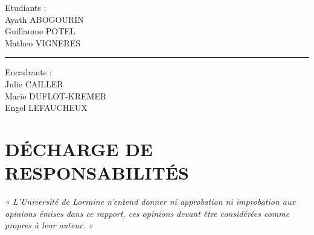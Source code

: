 \documentclass[11pt]{article}
\begin{document}
\begin{titlepage}
    \begin{minipage}[t]{0.45\textwidth}
        \begin{flushleft}
            \small Etudiants : \\
            \hspace*{1.5em} Ayath ABOGOURIN \\
            \hspace*{1.5em} Guillaume POTEL \\
            \hspace*{1.5em} Matheo VIGNERES
        \end{flushleft}
    \end{minipage}%
    \begin{minipage}[t]{0.1\textwidth}
        \vspace*{0.5em} %
        \centering
        \rule{1pt}{\baselineskip + 0.5em} %
    \end{minipage}%
    \begin{minipage}[t]{0.45\textwidth}
        \begin{flushright}
            \small Encadrants : \\
            \hspace*{0pt}\llap{\hspace*{1.5em}} Julie CAILLER \\
            \hspace*{0pt}\llap{\hspace*{1.5em}} Marie DUFLOT-KREMER \\
            \hspace*{0pt}\llap{\hspace*{1.5em}} Engel LEFAUCHEUX
        \end{flushright}
    \end{minipage}

\end{titlepage}


\newpage %
\null %

\newpage
\section*{DÉCHARGE DE RESPONSABILITÉS}
\vspace*{\fill}
\textit{« L’Université de Lorraine n’entend donner ni approbation ni improbation aux opinions émises dans ce
rapport, ces opinions devant être considérées comme propres à leur auteur. »}
\vspace*{\fill}
\end{document}
